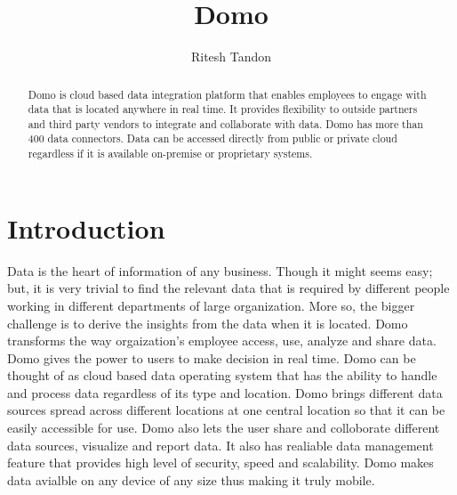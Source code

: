 
\title{Domo}

\author{Ritesh Tandon}


\renewcommand{\shortauthors}{R. Tandon}


\begin{abstract}
Domo is cloud based data integration platform that enables employees 
to engage with data that is located anywhere in real time. 
It provides flexibility to outside partners and third party vendors to 
integrate and collaborate with data. Domo has more than 400 data 
connectors. Data can be accessed directly from public or private 
cloud regardless if it is available on-premise or proprietary systems.
\end{abstract}


\maketitle


\section{Introduction}

Data is the heart of information of any business. 
Though it might seems easy; but, it is very trivial 
to find the relevant data that is required by different 
people working in different departments of large organization. 
More so, the bigger challenge is to derive the insights 
from the data when it is located.
Domo transforms the way orgaization's employee access, use, 
analyze and share data. Domo gives the power to users to 
make decision in real time. Domo can be thought of as cloud 
based data operating system that has the ability to handle 
and process data regardless of its type and location. 
Domo brings different data sources spread across different 
locations at one central location so that it can be easily 
accessible for use. Domo also lets the user share and 
colloborate different data sources, visualize and 
report data. It also has realiable data management feature 
that provides high level of security, speed and scalability. 
Domo makes data avialble on any device of any size thus 
making it truly mobile.


